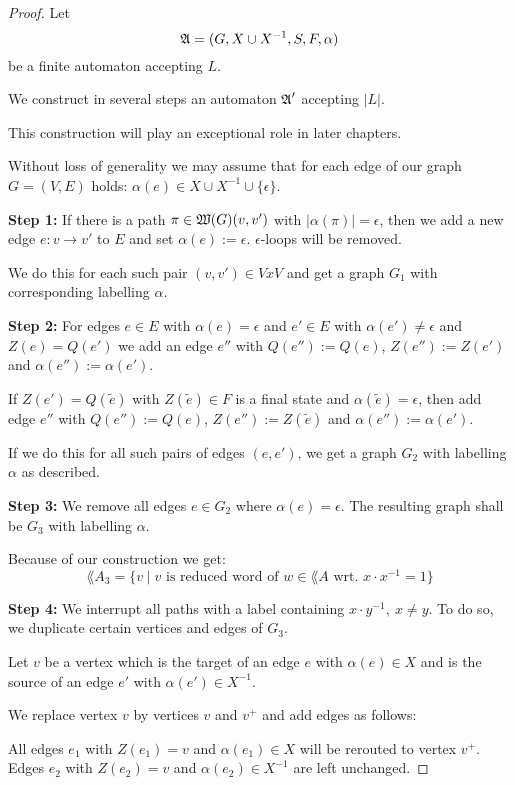 \begin{proof}
Let \[ \mbox{$\mathfrak{A}$} = (G, X \cup X^{-1}, S, F, \alpha) \] be a finite automaton
accepting $L$.

We construct in several steps an automaton $\mbox{$\mathfrak{A}$}'$ accepting $|L|$.

This construction will play an exceptional role in later chapters.

Without loss of generality we may assume that for each edge of our graph $G =
(V, E)$ holds: $\alpha(e) \in X\cup X^{-1}\cup \{\epsilon\}$.

{\bf Step 1:} If there is a path $\pi \in \mbox{$\mathfrak{W}(G)$}(v, v')$ with
$|\alpha(\pi)| = \epsilon$, then we add a new edge $e: v \to v'$ to $E$ and set
$\alpha(e) := \epsilon$. $\epsilon$-loops will be removed.

We do this for each such pair $(v, v')\in V x V$ and get a graph $G_1$ with
corresponding labelling $\alpha$.

{\bf Step 2:} For edges $e\in E$ with $\alpha(e) = \epsilon$ and $e'\in E$ with
$\alpha(e')\neq \epsilon$ and $Z(e) = Q(e')$ we add an edge $e''$ with
$Q(e'') := Q(e)$, $Z(e'') := Z(e')$ and $\alpha(e'') := \alpha(e')$.

If $Z(e') = Q(\tilde{e})$ with $Z(\tilde{e}) \in F$ is a final state and
$\alpha(\tilde{e}) = \epsilon$, then add edge $e''$ with $Q(e'') := Q(e)$,
$Z(e'') := Z(\tilde{e})$ and $\alpha(e'') := \alpha(e')$.


If we do this for all such pairs of edges $(e, e')$, we get a graph $G_2$ with
labelling $\alpha$ as described.

{\bf Step 3:} We remove all edges $e \in G_2$ where $\alpha(e) = \epsilon$. The
resulting graph shall be $G_3$ with labelling $\alpha$.

Because of our construction we get:
\[ \lang{A}_3 = \{ v \mid v \mbox{ is reduced word of } w \in
\lang{A} \mbox{ wrt. } x\cdot x^{-1} = 1 \} \]

{\bf Step 4:} We interrupt all paths with a label containing $x \cdot y^{-1},\
x\neq y$. To do so, we duplicate certain vertices and edges of $G_3$.

Let $v$ be a vertex which is the target of an edge $e$ with $\alpha(e) \in X$
and is the source of an edge $e'$ with $\alpha(e') \in X^{-1}$.

We replace vertex $v$ by vertices $v$ and $v^+$ and add edges as follows:

All edges $e_1$ with $Z(e_1) = v$ and $\alpha(e_1) \in X$ will be rerouted to
vertex $v^+$. Edges $e_2$ with $Z(e_2) = v$ and $\alpha(e_2) \in X^{-1}$ are
left unchanged.


\end{proof}
